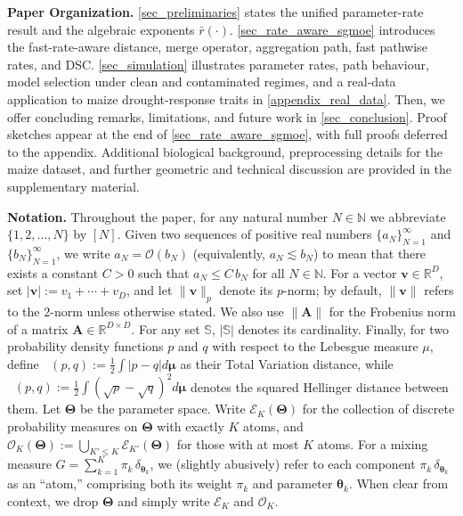 \documentclass[twoside]{article}
\DeclareMathOperator*{\TV}{D_{TV}}
\DeclareMathOperator*{\hels}{D_{h}^2}
\theoremstyle{plain}
\theoremstyle{definition}
\theoremstyle{plain}
\def\vmu{{\bm{\mu}}}
\def\vtheta{{\bm{\theta}}}
\def\vTheta{{\bm{\Theta}}}
\def\vv{{\bm{v}}}
\def\evv{{v}}
\def\mA{{\bm{A}}}
\def\sS{{\mathbb{S}}}
\newcommand{\R}{\mathbb{R}}
\newcommand{\Ns}{\mathbb{N}} %
\newcommand{\cE}{\mathcal{E}}
\newcommand{\cO}{\mathcal{O}}
\begin{document}

{\bf Paper Organization.}
\cref{sec_preliminaries} states the unified parameter-rate result and the algebraic exponents \(\bar r(\cdot)\).
\cref{sec_rate_aware_sgmoe} introduces the fast-rate-aware distance, merge operator, aggregation path, fast pathwise rates, and DSC.
\cref{sec_simulation} illustrates parameter rates, path behaviour, model selection under clean and contaminated regimes, and a real-data application to maize drought-response traits in \cref{appendix_real_data}.
Then, we offer concluding remarks, limitations, and future work in \cref{sec_conclusion}.
Proof sketches appear at the end of \cref{sec_rate_aware_sgmoe}, with full proofs deferred to the appendix.
Additional biological background, preprocessing details for the maize dataset, and further geometric and technical discussion are provided in the supplementary material.

{\bf Notation.} Throughout the paper, for any natural number $N\in\Ns$ we abbreviate $\{1,2,\ldots,N\}$ by $[N]$.
Given two sequences of positive real numbers $\{a_N\}_{N=1}^\infty$ and $\{b_N\}_{N=1}^\infty$, we write $a_N=\cO(b_N)$ (equivalently, $a_N\lesssim b_N$) to mean that there exists a constant $C>0$ such that $a_N\le C\,b_N$ for all $N\in\Ns$.
For a vector $\vv\in\R^D$, set $|\vv|:=\evv_1+\cdots+\evv_D$, and let $\|\vv\|_{p}$ denote its $p$-norm; by default, $\|\vv\|$ refers to the $2$-norm unless otherwise stated.
We also use $\|\mA\|$ for the Frobenius norm of a matrix $\mA\in\R^{D\times D}$.
For any set $\sS$, $|\sS|$ denotes its cardinality.
Finally, for two probability density functions $p$ and $q$ with respect to the Lebesgue measure $\mu$, define $\TV(p,q) := \frac 1 2 \int |p-q| d\vmu$ as their Total Variation distance, while $\hels(p,q) := \frac 1 2 \int (\sqrt p - \sqrt q)^2 d\vmu$ denotes the squared Hellinger distance between them. Let $\vTheta$ be the parameter space.
Write $\cE_K(\vTheta)$ for the collection of discrete probability measures on $\vTheta$ with exactly $K$ atoms, and $\cO_K(\vTheta):=\bigcup_{K'\le K}\cE_{K'}(\vTheta)$ for those with at most $K$ atoms.
For a mixing measure $G=\sum_{k=1}^{K}\pi_k\,\delta_{\vtheta_k}$, we (slightly abusively) refer to each component $\pi_k\,\delta_{\vtheta_k}$ as an “atom,” comprising both its weight $\pi_k$ and parameter $\vtheta_k$.
When clear from context, we drop $\vTheta$ and simply write $\cE_K$ and $\cO_K$.
\end{document}
